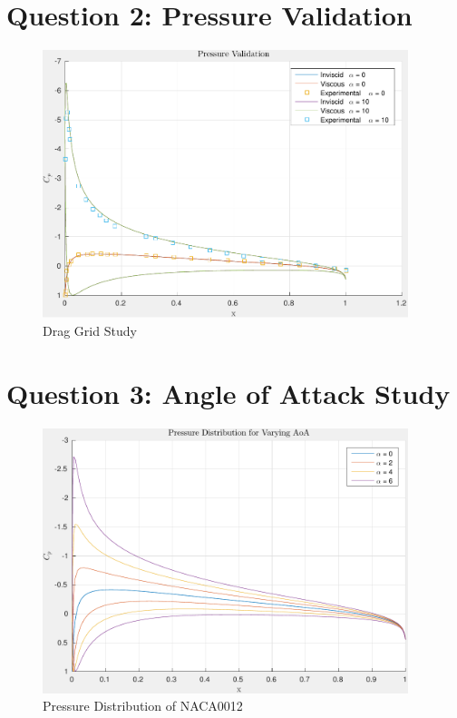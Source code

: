\documentclass[letterpaper,12pt,]{article}
\begin{document}
\section*{Question 2: Pressure Validation}

\begin{figure}[!h]
    \centering
    \includegraphics[width = 0.95\textwidth]{./figures/q2pressure.pdf}
    \caption{Drag Grid Study}
    \label{fig:q2}
\end{figure}

\section*{Question 3: Angle of Attack Study}

\begin{figure}[!h]
    \centering
    \includegraphics[width = 0.95\textwidth]{./figures/q3pressure.pdf}
    \caption{Pressure Distribution of NACA0012}
    \label{fig:q3p}
\end{figure}
\end{document}
